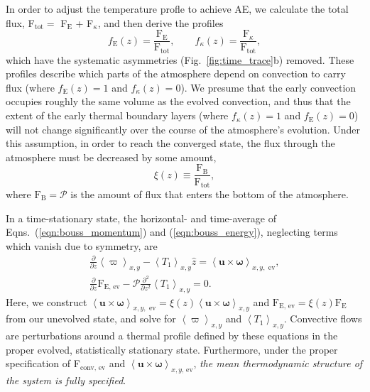 \documentclass[aps, pre, onecolumn, nofootinbib, notitlepage, groupedaddress, amsfonts, amssymb, amsmath, longbibliography]{revtex4-1}
\newcommand{\angles}[1]{\ensuremath{\left\langle #1 \right\rangle}}
\begin{document}
In order to adjust the temperature profle to achieve AE, we calculate the total flux,
F$_{\text{tot}} =$ F$_{\text{E}}$ + F$_{\kappa}$, and then derive the profiles
\begin{equation}
f_{\text{E}}(z) = \frac{\text{F}_{\text{E}}}{\text{F}_{\text{tot}}},\qquad
f_{\kappa}(z) = \frac{\text{F}_{\kappa}}{\text{F}_{\text{tot}}},
\label{eqn:bvp_ratios}
\end{equation}
which have the systematic asymmetries (Fig.~\ref{fig:time_trace}b) removed. These profiles describe which
parts of the atmosphere depend on convection to carry flux (where $f_{\text{E}}(z) = 1$
and $f_{\kappa}(z) = 0$).
We presume that the early convection occupies roughly the same volume as the evolved
convection, and thus that the extent of the early thermal boundary layers 
(where $f_{\kappa}(z) = 1$ and $f_{\text{E}}(z) = 0$) 
will not change significantly over the course of the atmosphere's evolution.
Under this assumption, in order to reach the converged state, 
the flux through the atmosphere must be decreased by some amount,
\begin{equation}
\xi(z) \equiv \frac{\text{F}_{\text{B}}}{\text{F}_{\text{tot}}},
\label{eqn:xi}
\end{equation}
where $\text{F}_{\text{B}} = \mathcal{P}$ is the amount of flux that enters the
bottom of the atmosphere.

In a time-stationary state, the horizontal- and time-average of
Eqns.~(\ref{eqn:bouss_momentum}) and (\ref{eqn:bouss_energy}), neglecting terms which
vanish due to symmetry, are
\begin{gather}
\frac{\partial}{\partial z}\angles{\varpi}_{x,y} - \angles{T_1}_{x,y}\hat{z} = \angles{\bm{u}\times\bm{\omega}}_{x,y, \text{ ev}},
	\label{eqn:bouss_BVP_momentum}
\\
\frac{\partial}{\partial z}\text{F}_{\text{E, ev}} - \mathcal{P}\frac{\partial^2}{\partial z^2} \angles{T_1}_{x,y} = 0.
	\label{eqn:bouss_BVP_energy}
\end{gather}
Here, we construct $\angles{\bm{u}\times\bm{\omega}}_{x, y,\text{ ev}} =
\xi(z) \angles{\bm{u}\times\bm{\omega}}_{x, y}$ and $\text{F}_{\text{E, ev}} = \xi(z) \text{F}_{\text{E}}$
from our unevolved state, and solve for $\angles{\varpi}_{x,y}$ and $\angles{T_1}_{x,y}$.
Convective flows
are perturbations around a thermal profile defined by these equations in the proper evolved, 
statistically stationary state. Furthermore, under the proper specification of
F$_{\text{conv, ev}}$ and $\angles{\bm{u}\times\bm{\omega}}_{x,y\text{, ev}}$,
\emph{the mean thermodynamic structure of the system is fully specified}.
\end{document}
